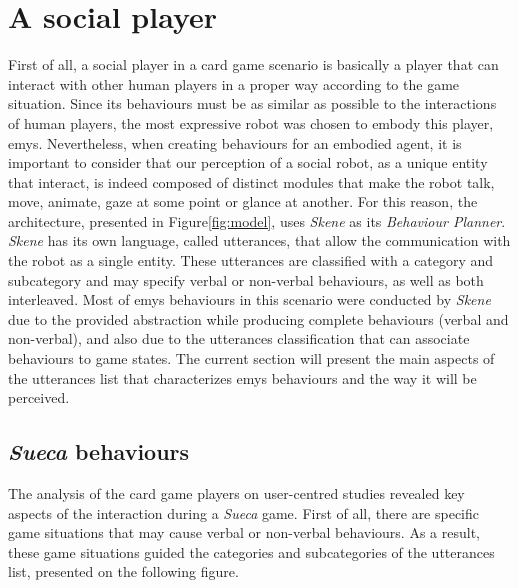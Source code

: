 \section{A social player}
\label{sec:social-player}

First of all, a social player in a card game scenario is basically a player that can interact with other human players in a proper way according to the game situation.
Since its behaviours must be as similar as possible to the interactions of human players, the most expressive robot was chosen to embody this player, \ac{emys}.
Nevertheless, when creating behaviours for an embodied agent, it is important to consider that our perception of a social robot, as a unique entity that interact, is indeed composed of distinct modules that make the robot talk, move, animate, gaze at some point or glance at another.
For this reason, the architecture, presented in Figure\ref{fig:model}, uses \emph{Skene} as its \emph{Behaviour Planner}.
\emph{Skene} has its own language, called utterances, that allow the communication with the robot as a single entity.
These utterances are classified with a category and subcategory and may specify verbal or non-verbal behaviours, as well as both interleaved.
Most of \ac{emys} behaviours in this scenario were conducted by \emph{Skene} due to the provided abstraction while producing complete behaviours (verbal and non-verbal), and also due to the utterances classification that can associate behaviours to game states.
The current section will present the main aspects of the utterances list that characterizes \ac{emys} behaviours and the way it will be perceived.



\subsection{\emph{Sueca} behaviours}
The analysis of the card game players on user-centred studies revealed key aspects of the interaction during a \emph{Sueca} game.
First of all, there are specific game situations that may cause verbal or non-verbal behaviours.
As a result, these game situations guided the categories and subcategories of the utterances list, presented on the following figure.

